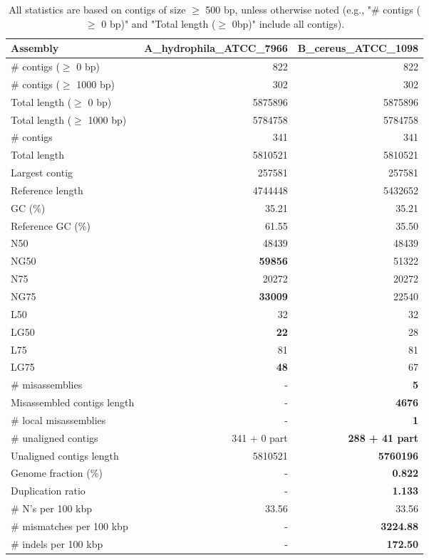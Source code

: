 \documentclass[12pt,a4paper]{article}
\begin{document}
\begin{table}[ht]
\begin{center}
\caption{All statistics are based on contigs of size $\geq$ 500 bp, unless otherwise noted (e.g., "\# contigs ($\geq$ 0 bp)" and "Total length ($\geq$ 0bp)" include all contigs).}
\begin{tabular}{|l*{2}{|r}|}
\hline
Assembly & A\_hydrophila\_ATCC\_7966 & B\_cereus\_ATCC\_1098 \\ \hline
\# contigs ($\geq$ 0 bp) & 822 & 822 \\ \hline
\# contigs ($\geq$ 1000 bp) & 302 & 302 \\ \hline
Total length ($\geq$ 0 bp) & 5875896 & 5875896 \\ \hline
Total length ($\geq$ 1000 bp) & 5784758 & 5784758 \\ \hline
\# contigs & 341 & 341 \\ \hline
Total length & 5810521 & 5810521 \\ \hline
Largest contig & 257581 & 257581 \\ \hline
Reference length & 4744448 & 5432652 \\ \hline
GC (\%) & 35.21 & 35.21 \\ \hline
Reference GC (\%) & 61.55 & 35.50 \\ \hline
N50 & 48439 & 48439 \\ \hline
NG50 & {\bf 59856} & 51322 \\ \hline
N75 & 20272 & 20272 \\ \hline
NG75 & {\bf 33009} & 22540 \\ \hline
L50 & 32 & 32 \\ \hline
LG50 & {\bf 22} & 28 \\ \hline
L75 & 81 & 81 \\ \hline
LG75 & {\bf 48} & 67 \\ \hline
\# misassemblies & - & {\bf 5} \\ \hline
Misassembled contigs length & - & {\bf 4676} \\ \hline
\# local misassemblies & - & {\bf 1} \\ \hline
\# unaligned contigs & 341 + 0 part & {\bf 288 + 41 part} \\ \hline
Unaligned contigs length & 5810521 & {\bf 5760196} \\ \hline
Genome fraction (\%) & - & {\bf 0.822} \\ \hline
Duplication ratio & - & {\bf 1.133} \\ \hline
\# N's per 100 kbp & 33.56 & 33.56 \\ \hline
\# mismatches per 100 kbp & - & {\bf 3224.88} \\ \hline
\# indels per 100 kbp & - & {\bf 172.50} \\ \hline
\end{tabular}
\end{center}
\end{table}
\end{document}
